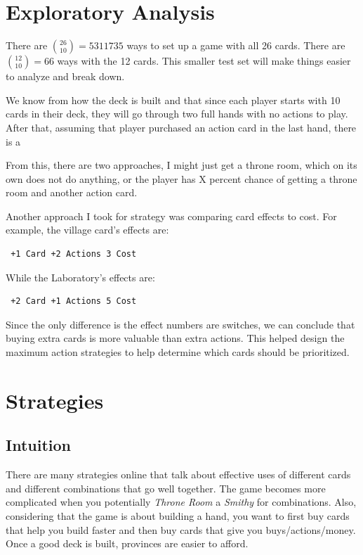 \documentclass[11pt, oneside]{article}   	%
\begin{document}
\section{Exploratory Analysis}

There are $\binom{26}{10} = 5311735$ ways to set up a game with all 26 cards. \newline
\newline
There are $\binom{12}{10} = 66$ ways with the 12 cards. This smaller test set will make things easier to analyze and break down. \newline

We know from how the deck is built and that since each player starts with 10 cards in their deck, they will go through two full hands with no actions to play. After that, assuming that player purchased an action card in the last hand, there is a 

From this, there are two approaches, I might just get a throne room, which on its own does not do anything, or the player has  X percent chance of getting a throne room and another action card. 

Another approach I took for strategy was comparing card effects to cost. For example, the village card's effects are: \begin{verbatim} +1 Card +2 Actions 3 Cost \end{verbatim}  While the Laboratory's effects are: \begin{verbatim} +2 Card +1 Actions 5 Cost \end{verbatim}
Since the only difference is the effect numbers are switches, we can conclude that buying extra cards is more valuable than extra actions. This helped design the maximum action strategies to help determine which cards should be prioritized.



\section{Strategies}

\subsection{Intuition}

There are many strategies online that talk about effective uses of different cards and different combinations that go well together. The game becomes more complicated when you potentially \textit{Throne Room} a \textit{Smithy} for combinations. Also, considering that the game is about building a hand, you want to first buy cards that help you build faster and then buy cards that give you buys/actions/money. Once a good deck is built, provinces are easier to afford. 
\end{document}
